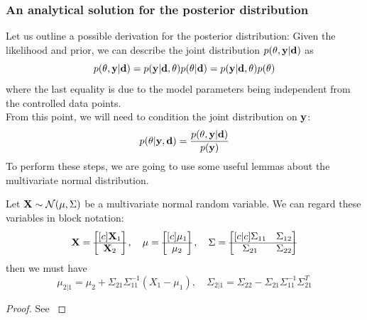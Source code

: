 \subsubsection{An analytical solution for the posterior distribution}
Let us outline a possible derivation for the posterior distribution: Given the likelihood and prior, we can describe the joint distribution $p(\theta, \mathbf{y} | \mathbf{d})$ as
\begin{equation}
  \label{eq:joint}
  p(\theta, \mathbf{y} | \mathbf{d}) = p(\mathbf{y} | \mathbf{d}, \theta)p(\theta | \mathbf{d}) = p(\mathbf{y} | \mathbf{d}, \theta)p(\theta)
\end{equation}
where the last equality is due to the model parameters being independent from the controlled data points. \\
From this point, we will need to condition the joint distribution on $\mathbf{y}$:
\begin{equation}
  \label{eq:joint-conditioned}
  p(\theta | \mathbf{y}, \mathbf{d}) = \frac{p(\theta, \mathbf{y} | \mathbf{d})}{p(\mathbf{y})}
\end{equation}
To perform these steps, we are going to use some useful lemmas about the multivariate normal distribution.
\begin{lemma}
  \label{lemma:block-conditional}
  Let $\mathbf{X} \sim \mathcal{N}(\mathbf{\mu}, \Sigma)$ be a multivariate normal random variable. We can regard these variables in block notation:
  \begin{equation}
  \mathbf{X}=\begin{bmatrix}[c]
    \mathbf{X}_1\\
    \hline
    \mathbf{X}_2
  \end{bmatrix}, \quad \mu = \begin{bmatrix}[c]
    \mu_{1}\\
    \hline
    \mu_{2}
  \end{bmatrix},\quad \Sigma=\begin{bmatrix}[c|c]
  \Sigma_{11} & \Sigma_{12}\\
    \hline
    \Sigma_{21} & \Sigma_{22}
  \end{bmatrix}
\end{equation}
  then we must have
  \begin{equation}\mu_{2|1}=\mu_2 + \Sigma_{21}\Sigma_{11}^{-1}(X_1 - \mu_1),\quad \Sigma_{2|1} = \Sigma_{22} - \Sigma_{21}\Sigma_{11}^{-1}\Sigma_{21}^T\end{equation}
\end{lemma}
\begin{proof}
  See \citet{krause22} 
\end{proof}
